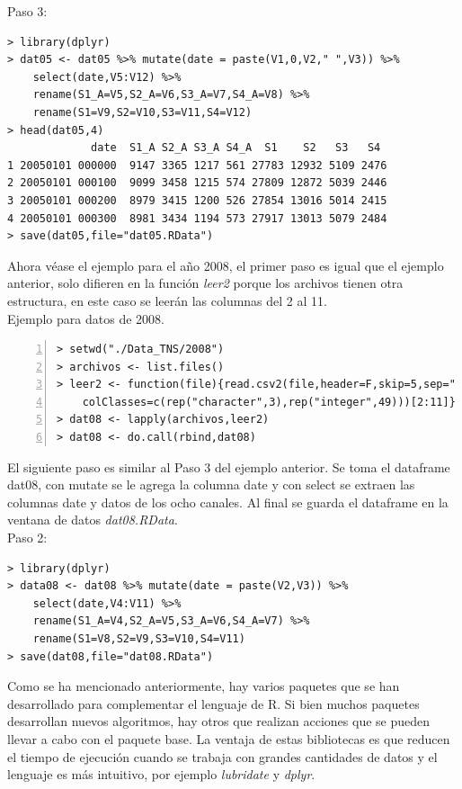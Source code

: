 Paso 3:
\begin{mybox}
\begin{verbatim}
> library(dplyr)
> dat05 <- dat05 %>% mutate(date = paste(V1,0,V2," ",V3)) %>%
	select(date,V5:V12) %>%
	rename(S1_A=V5,S2_A=V6,S3_A=V7,S4_A=V8) %>%
	rename(S1=V9,S2=V10,S3=V11,S4=V12)
> head(dat05,4)
             date  S1_A S2_A S3_A S4_A  S1    S2   S3   S4 
1 20050101 000000  9147 3365 1217 561 27783 12932 5109 2476
2 20050101 000100  9099 3458 1215 574 27809 12872 5039 2446
3 20050101 000200  8979 3415 1200 526 27854 13016 5014 2415
4 20050101 000300  8981 3434 1194 573 27917 13013 5079 2484
> save(dat05,file="dat05.RData")
\end{verbatim}
\end{mybox}

Ahora véase el ejemplo para el año 2008, el primer paso es igual que el ejemplo anterior, solo difieren en la función \emph{leer2} porque los archivos tienen otra estructura, en este caso  se leerán las columnas del 2 al 11.\\

Ejemplo para datos de 2008.
\begin{mybox}
\begin{Verbatim}[numbers=left,xleftmargin=5mm]
> setwd("./Data_TNS/2008")
> archivos <- list.files()
> leer2 <- function(file){read.csv2(file,header=F,skip=5,sep=" ",
	colClasses=c(rep("character",3),rep("integer",49)))[2:11]}
> dat08 <- lapply(archivos,leer2)
> dat08 <- do.call(rbind,dat08)
\end{Verbatim}
\end{mybox}

El siguiente paso es similar al Paso 3 del ejemplo anterior. Se toma el dataframe dat08, con mutate se le agrega la columna date y con select se extraen las columnas date y datos de los ocho canales. Al final se guarda el dataframe en la ventana de datos \emph{dat08.RData}.\\

Paso 2:
\begin{mybox}
\begin{verbatim}
> library(dplyr)
> data08 <- dat08 %>% mutate(date = paste(V2,V3)) %>%
	select(date,V4:V11) %>%
	rename(S1_A=V4,S2_A=V5,S3_A=V6,S4_A=V7) %>%
	rename(S1=V8,S2=V9,S3=V10,S4=V11)
> save(dat08,file="dat08.RData")
\end{verbatim}
\end{mybox}

Como se ha mencionado anteriormente, hay varios paquetes que se han desarrollado para complementar el lenguaje de R. Si bien muchos paquetes desarrollan nuevos algoritmos, hay otros que realizan acciones que se pueden llevar a cabo con el paquete base. La ventaja de estas bibliotecas es que reducen el tiempo de ejecución cuando se trabaja con grandes cantidades de datos y el lenguaje es más intuitivo, por ejemplo \emph{lubridate} y \emph{dplyr}.\\ 

